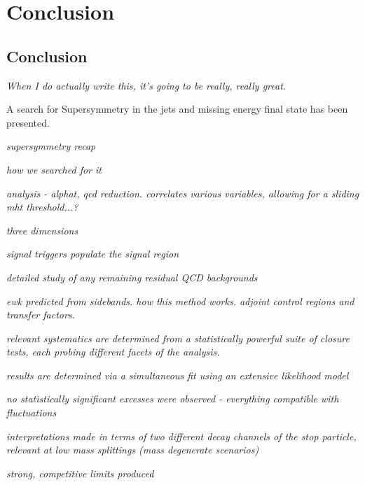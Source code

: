 \chapter{Conclusion}
\label{ch:conclusion}

\ifpdf
    \graphicspath{{Chapter10/Figs/Raster/}{Chapter10/Figs/PDF/}{Chapter10/Figs/}}
\else
    \graphicspath{{Chapter10/Figs/Vector/}{Chapter10/Figs/}}
\fi


\section{Conclusion}  %
\emph{When I do actually write this, it's going to be really, really great.}


A search for Supersymmetry in the jets and missing energy final state has been
presented.

\emph{supersymmetry recap}

\emph{how we searched for it}

\emph{analysis - alphat, qcd reduction. correlates various variables, allowing
for a sliding mht threshold...?}

\emph{three dimensions}

\emph{signal triggers populate the signal region}

\emph{detailed study of any remaining residual QCD backgrounds}

\emph{ewk predicted from sidebands. how this method works. adjoint control
regions and transfer factors.}

\emph{relevant systematics are determined from a statistically powerful suite
of closure tests, each probing different facets of the analysis.}

\emph{results are determined via a simultaneous fit using an extensive
likelihood model}

\emph{no statistically significant excesses were observed - everything
compatible with fluctuations}

\emph{interpretations made in terms of two different decay channels of the stop
particle, relevant at low mass splittings (mass degenerate scenarios)}

\emph{strong, competitive limits produced}

